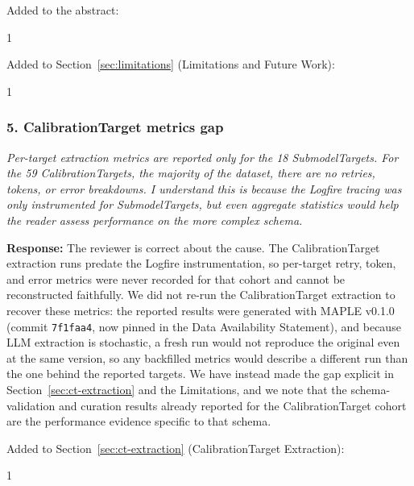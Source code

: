 \documentclass[11pt]{article}
\newcommand{\reviewer}[1]{\textcolor{reviewercolor}{\textit{#1}}}
\newcommand{\response}[1]{\textcolor{responsecolor}{\textbf{Response:} #1}}
\providecommand{\trackchanges}{1}
\newenvironment{revised}{\if1\trackchanges\color{blue}\fi}{}
\begin{document}
\medskip

Added to the abstract:

\begin{revised}

\end{revised}

\medskip

Added to Section~\ref{sec:limitations} (Limitations and Future Work):

\begin{revised}

\end{revised}

\bigskip

\subsubsection*{5. CalibrationTarget metrics gap}

\reviewer{Per-target extraction metrics are reported only for the 18 SubmodelTargets. For the 59 CalibrationTargets, the majority of the dataset, there are no retries, tokens, or error breakdowns. I understand this is because the Logfire tracing was only instrumented for SubmodelTargets, but even aggregate statistics would help the reader assess performance on the more complex schema.}

\response{The reviewer is correct about the cause. The CalibrationTarget extraction runs predate the Logfire instrumentation, so per-target retry, token, and error metrics were never recorded for that cohort and cannot be reconstructed faithfully. We did not re-run the CalibrationTarget extraction to recover these metrics: the reported results were generated with MAPLE v0.1.0 (commit \texttt{7f1faa4}, now pinned in the Data Availability Statement), and because LLM extraction is stochastic, a fresh run would not reproduce the original even at the same version, so any backfilled metrics would describe a different run than the one behind the reported targets. We have instead made the gap explicit in Section~\ref{sec:ct-extraction} and the Limitations, and we note that the schema-validation and curation results already reported for the CalibrationTarget cohort are the performance evidence specific to that schema.}

\medskip

Added to Section~\ref{sec:ct-extraction} (CalibrationTarget Extraction):

\begin{revised}

\end{revised}
\end{document}
